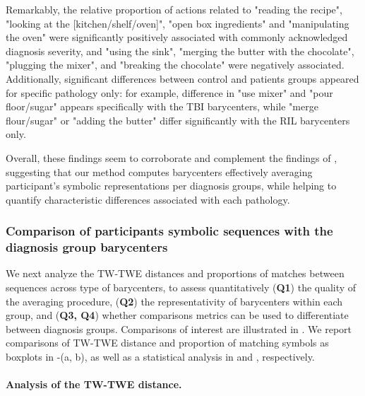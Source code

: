 \begin{chapterabstract}
        Remarkably, the relative proportion of actions related to "reading the recipe", "looking at the [kitchen/shelf/oven]", "open box ingredients" and "manipulating the oven" were significantly positively associated with commonly acknowledged diagnosis severity, and "using the sink", "merging the butter with the chocolate", "plugging the mixer", and "breaking the chocolate" were negatively associated. Additionally, significant differences between control and patients groups appeared for specific pathology only: for example, difference in "use mixer" and "pour floor/sugar" appears specifically with the TBI barycenters,  while "merge flour/sugar" or "adding the butter" differ significantly with the RIL barycenters only.
        
        Overall, these findings seem to corroborate and complement the findings of , suggesting that our method computes barycenters effectively averaging participant's symbolic representations per diagnosis groups, while helping to quantify characteristic differences associated with each pathology.


        \subsubsection{Comparison of participants symbolic sequences with the diagnosis group barycenters}

        We next analyze the TW-TWE distances and proportions of matches between sequences across type of barycenters, to assess quantitatively (\textbf{Q1}) the quality of the averaging procedure, (\textbf{Q2}) the representativity of barycenters within each group, and (\textbf{Q3, Q4}) whether comparisons metrics can be used to differentiate between diagnosis groups. Comparisons of interest are illustrated in . We report comparisons of TW-TWE distance and proportion of matching symbols as boxplots in -(a, b), as well as a statistical analysis in  and , respectively. 


        \paragraph{Analysis of the TW-TWE distance.\\}


\end{chapterabstract}
